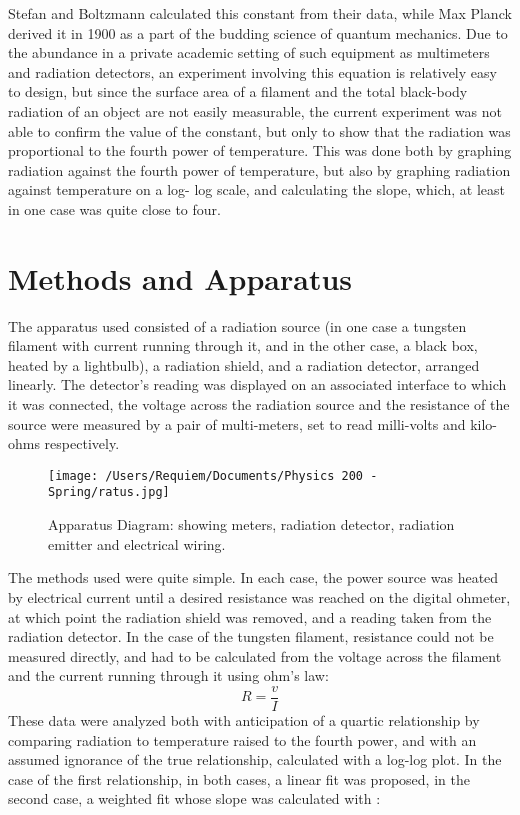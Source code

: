 \documentclass[aps,pre,twocolumn,nofootinbib]{revtex4}
\begin{document}
\cite{constant} Stefan and Boltzmann calculated this constant from their data, while Max Planck derived it in 1900 as a part of the budding science of quantum mechanics. Due to the abundance in a private academic setting of such equipment as multimeters and radiation detectors, an experiment involving this equation is relatively easy to design, but since the surface area of a filament and the total black-body radiation of an object are not easily measurable, the current experiment was not able to confirm the value of the constant, but only to show that the radiation was proportional to the fourth power of temperature.  This was done both by graphing radiation against the fourth power of temperature, but also by graphing radiation against temperature on a log- log scale, and calculating the slope, which, at least in one case was quite close to four.  

\section{Methods and Apparatus}
The apparatus used consisted of a radiation source (in one case a tungsten filament with current running through it, and in the other case, a black box, heated by a lightbulb), a radiation shield, and a radiation detector, arranged linearly.  The detector's reading was displayed on an associated interface to which it was connected, the voltage across the radiation source and the resistance of the source were measured by a pair of multi-meters, set to read milli-volts and kilo-ohms respectively.  

\begin{figure}[h]
\centering
\texttt{[image: /Users/Requiem/Documents/Physics 200 - Spring/ratus.jpg]} 
\caption{Apparatus Diagram: showing meters, radiation detector, radiation emitter and electrical wiring. }
\label{hight}
\end{figure}

The methods used were quite simple.  In each case, the power source was heated by electrical current until a desired resistance was reached on the digital ohmeter, at which point the radiation shield was removed, and a reading taken from the radiation detector.  In the case of the tungsten filament, resistance could not be measured directly, and had to be calculated from the voltage across the filament and the current running through it using ohm's law:
\begin{equation}
\label{Ohm's Law}
R=\frac{v}{I}
\end{equation}
These data were analyzed both with anticipation of a quartic relationship by comparing radiation to temperature raised to the fourth power, and with an assumed ignorance of the true relationship, calculated with a log-log plot.  In the case of the first relationship, in both cases, a linear fit was proposed, in the second case, a weighted fit whose slope was calculated with \cite{Taylor1997}: 
\end{document}

